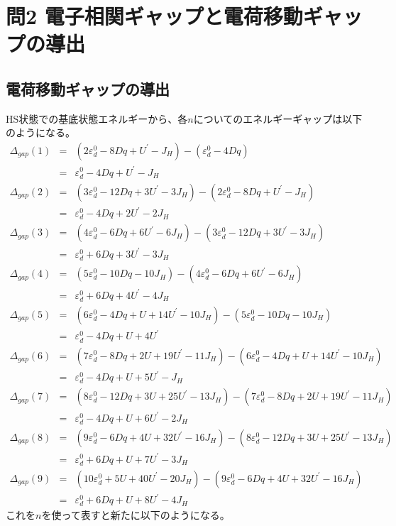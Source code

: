 \documentclass{jsarticle}
\begin{document}
\section{問2 電子相関ギャップと電荷移動ギャップの導出}

\subsection{電荷移動ギャップの導出}
HS状態での基底状態エネルギーから、各$n$についてのエネルギーギャップは以下のようになる。
\begin{eqnarray}
  \Delta _{gap}(1) &=& (2 \varepsilon_d^0 - 8Dq + U^{\prime} - J_H) - (\varepsilon_d^0 - 4Dq) \nonumber \\
  &=& \varepsilon_d^0 - 4Dq + U^{\prime} - J_H \nonumber \\
  \Delta _{gap}(2) &=&  (3 \varepsilon_d^0 - 12Dq + 3U^{\prime} -3J_H) - (2 \varepsilon_d^0 - 8Dq + U^{\prime} - J_H) \nonumber \\
  &=& \varepsilon_d^0 - 4Dq + 2U^{\prime} - 2J_H \nonumber \\
  \Delta _{gap}(3) &=& (4 \varepsilon_d^0 - 6Dq + 6U^{\prime} - 6J_H) - (3\varepsilon_d^0 - 12Dq + 3U^{\prime} - 3J_H) \nonumber \\
  &=& \varepsilon_d^0 + 6Dq + 3U^{\prime} - 3J_H \nonumber \\
  \Delta _{gap}(4) &=&  (5 \varepsilon_d^0 - 10Dq - 10J_H) - (4 \varepsilon_d^0 - 6Dq + 6U^{\prime} - 6J_H) \nonumber \\
  &=& \varepsilon_d^0 + 6Dq + 4U^{\prime} - 4J_H \nonumber \\
  \Delta _{gap}(5) &=& (6 \varepsilon_d^0 - 4Dq + U + 14U^{\prime} - 10J_H) - (5 \varepsilon_d^0 - 10Dq - 10J_H) \nonumber \\
  &=& \varepsilon_d^0 - 4Dq + U + 4U^{\prime} \nonumber \\
  \Delta _{gap}(6) &=& (7 \varepsilon_d^0 - 8Dq + 2U + 19U^{\prime} -11J_H) - (6 \varepsilon_d^0 - 4Dq + U + 14U^{\prime} - 10J_H) \nonumber \\
  &=& \varepsilon_d^0 - 4Dq + U + 5U^{\prime} - J_H \nonumber \\
  \Delta _{gap}(7) &=& (8 \varepsilon_d^0 - 12Dq + 3U + 25U^{\prime} - 13J_H) - (7 \varepsilon_d^0 - 8Dq + 2U + 19U^{\prime} -11J_H) \nonumber \\
  &=& \varepsilon_d^0 - 4Dq + U + 6U^{\prime} - 2J_H \nonumber \\
  \Delta _{gap}(8) &=& (9 \varepsilon_d^0 - 6Dq + 4U + 32U^{\prime} -16J_H) - (8 \varepsilon_d^0 - 12Dq + 3U + 25U^{\prime} - 13J_H) \nonumber \\
  &=& \varepsilon_d^0 + 6Dq + U + 7U^{\prime} - 3J_H \nonumber \\
  \Delta _{gap}(9) &=& (10 \varepsilon_d^0 + 5U + 40U^{\prime} - 20J_H) - (9 \varepsilon_d^0 - 6Dq + 4U + 32U^{\prime} -16J_H) \nonumber \\
  &=& \varepsilon_d^0 + 6Dq + U + 8U^{\prime} - 4J_H \nonumber
\end{eqnarray}
これを$n$を使って表すと新たに以下のようになる。
\end{document}

